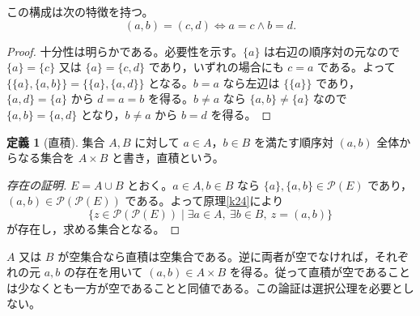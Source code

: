 \documentclass[a5paper,10pt,dvipdfmx]{jsarticle}
\theoremstyle{definition}
\newtheorem{defn}[ruledef]{定義}
\theoremstyle{plain}
\newcommand{\iffc}{\Longleftrightarrow}
\newcommand{\Pow}{\mathcal{P}}
\begin{document}
\noindent この構成は次の特徴を持つ。
\[
 (a,b)=(c,d)\iffc a=c\land b=d.
\]
\begin{proof}
十分性は明らかである。必要性を示す。$\{a\}$ は右辺の順序対の元なので $\{a\}=\{c\}$ 又は $\{a\}=\{c,d\}$ であり，いずれの場合にも $c=a$ である。よって $\{\{a\},\{a,b\}\}=\{\{a\},\{a,d\}\}$ となる。$b=a$ なら左辺は $\{\{a\}\}$ であり，$\{a,d\}=\{a\}$ から $d=a=b$ を得る。$b\ne a$ なら $\{a,b\}\ne\{a\}$ なので $\{a,b\}=\{a,d\}$ となり，$b\ne a$ から $b=d$ を得る。
\end{proof}
\begin{defn}[直積]\label{k33}
集合 $A,B$ に対して $a\in A$，$b\in B$ を満たす順序対 $(a,b)$ 全体からなる集合を $A\times B$ と書き，直積という。
\end{defn}
\begin{proof}[存在の証明]
$E=A\cup B$ とおく。$a\in A,b\in B$ なら $\{a\},\{a,b\}\in\Pow(E)$ であり，$(a,b)\in\Pow(\Pow(E))$ である。よって原理\ref{k24}により
\[
 \{z\in\Pow(\Pow(E))\mid
 \exists a\in A,\ \exists b\in B,\ z=(a,b)\}
\]
が存在し，求める集合となる。
\end{proof}
$A$ 又は $B$ が空集合なら直積は空集合である。逆に両者が空でなければ，それぞれの元 $a,b$ の存在を用いて $(a,b)\in A\times B$ を得る。従って直積が空であることは少なくとも一方が空であることと同値である。この論証は選択公理を必要としない。
\end{document}
